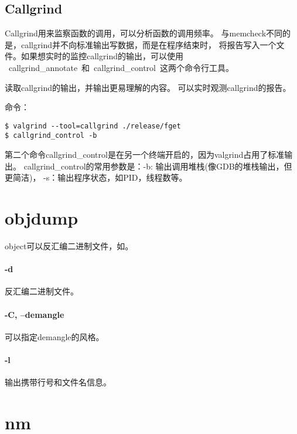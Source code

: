 
\subsection{Callgrind}
Callgrind用来监察函数的调用，可以分析函数的调用频率。
与memcheck不同的是，callgrind并不向标准输出写数据，而是在程序结束时，
将报告写入一个文件。如果想实时的监控callgrind的输出，可以使用
~callgrind\_annotate~和~callgrind\_control~这两个命令行工具。

读取callgrind的输出，并输出更易理解的内容。
可以实时观测callgrind的报告。

命令：
\begin{verbatim}
$ valgrind --tool=callgrind ./release/fget 
$ callgrind_control -b
\end{verbatim}
第二个命令callgrind\_control是在另一个终端开启的，因为valgrind占用了标准输出。
callgrind\_control的常用参数是：-b: 输出调用堆栈(像GDB的堆栈输出，但更简洁)，
-s：输出程序状态，如PID，线程数等。


\section{objdump}
object可以反汇编二进制文件，如。
\paragraph{-d}反汇编二进制文件。
\paragraph{-C, --demangle}可以指定demangle的风格。
\paragraph{-l}输出携带行号和文件名信息。

\section{nm}

